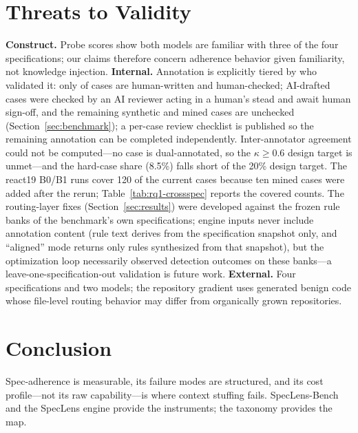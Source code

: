 \documentclass[11pt]{article}
\begin{document}
\section{Threats to Validity}
\textbf{Construct.} Probe scores show both models are familiar with three of the
four specifications; our claims therefore concern adherence behavior given
familiarity, not knowledge injection.
\textbf{Internal.} Annotation is explicitly tiered by who validated it: only
\benchNHand{} of \benchN{} cases are human-written and human-checked;
\benchNAiRev{} AI-drafted cases were checked by an AI reviewer acting in a
human's stead and await human sign-off, and the remaining \benchNSyn{} synthetic
and \benchNMined{} mined cases are unchecked
(Section~\ref{sec:benchmark}); a per-case review checklist is published so the
remaining annotation can be completed independently. Inter-annotator agreement
could not be computed---no case is dual-annotated, so the $\kappa\geq 0.6$
design target is unmet---and the hard-case share (8.5\%) falls short of the
20\% design target. The react19 B0/B1 runs cover 120 of the current \nReact{}
cases because ten mined cases were added after the rerun;
Table~\ref{tab:rq1-crossspec} reports the covered counts. The routing-layer
fixes (Section~\ref{sec:results}) were developed against the frozen rule banks
of the benchmark's own specifications; engine inputs never include annotation
content (rule text derives from the specification snapshot only, and
``aligned'' mode returns only rules synthesized from that snapshot), but the
optimization loop necessarily observed detection outcomes on these banks---a
leave-one-specification-out validation is future work.
\textbf{External.} Four specifications and two models; the repository gradient
uses generated benign code whose file-level routing behavior may differ from
organically grown repositories.

\section{Conclusion}
Spec-adherence is measurable, its failure modes are structured, and its cost
profile---not its raw capability---is where context stuffing fails.
SpecLens-Bench and the SpecLens engine provide the instruments; the taxonomy
provides the map.



\end{document}
